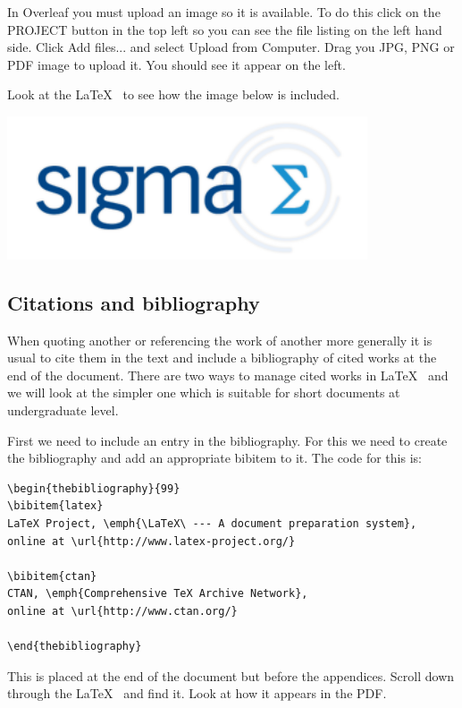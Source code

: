 \documentclass[a4paper,14pt]{extarticle}
\begin{document}
In Overleaf you must upload an image so it is available. To do this click on the PROJECT button in the top left so you can see the file listing on the left hand side. Click Add files... and select Upload from Computer. Drag you JPG, PNG or PDF image to upload it. You should see it appear on the left.

Look at the \LaTeX~ to see how the image below is included.

\includegraphics[width=0.8\textwidth]{sigma-logo.png}

\subsection{Citations and bibliography}

When quoting another or referencing the work of another more generally it is usual to cite them in the text and include a bibliography of cited works at the end of the document. There are two ways to manage cited works in \LaTeX~ and we will look at the simpler one which is suitable for short documents at undergraduate level. 

First we need to include an entry in the bibliography. For this we need to create the bibliography and add an appropriate bibitem to it. The code for this is:
\begin{verbatim}
\begin{thebibliography}{99}
\bibitem{latex}
LaTeX Project, \emph{\LaTeX\ --- A document preparation system}, 
online at \url{http://www.latex-project.org/}

\bibitem{ctan}
CTAN, \emph{Comprehensive TeX Archive Network}, 
online at \url{http://www.ctan.org/}

\end{thebibliography}
\end{verbatim}
This is placed at the end of the document but before the appendices. Scroll down through the \LaTeX~ and find it. Look at how it appears in the PDF. 
\end{document}
